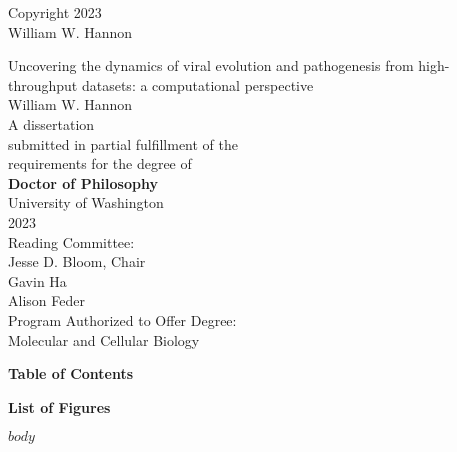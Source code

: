 \documentclass[12pt,oneside,letterpaper]{report}
\begin{document}
\thispagestyle{empty}
\begin{center}
\textcopyright{} Copyright 2023 \\
William W. Hannon
\end{center}
\vspace*{\fill}
\newpage

\thispagestyle{empty}
\begin{center}
\huge{Uncovering the dynamics of viral evolution and pathogenesis from high-throughput datasets: a computational perspective} \\
\vspace{2cm}
\Large{William W. Hannon} \\
\vspace{2cm}
A dissertation \\
submitted in partial fulfillment of the \\
requirements for the degree of \\
\vspace{1cm}
\textbf{Doctor of Philosophy} \\
\vspace{1cm}
University of Washington \\
2023 \\
\vspace{1cm}
Reading Committee: \\
Jesse D. Bloom, Chair \\
Gavin Ha \\
Alison Feder \\
\vspace{1cm}
Program Authorized to Offer Degree: \\
Molecular and Cellular Biology
\end{center}
\newpage


\newpage

\textbf{Table of Contents}
\newpage

\textbf{List of Figures}
\newpage


\newpage

$body$
\newpage

 

\end{document}
